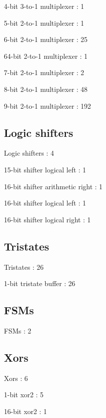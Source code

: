 \documentclass[letterpaper, 11 pt, conference]{article}
\begin{document}
 4-bit 3-to-1 multiplexer                              : 1

 5-bit 2-to-1 multiplexer                              : 1

 6-bit 2-to-1 multiplexer                              : 25

 64-bit 2-to-1 multiplexer                             : 1

 7-bit 2-to-1 multiplexer                              : 2

 8-bit 2-to-1 multiplexer                              : 48

 9-bit 2-to-1 multiplexer                              : 192

\subsection{ Logic shifters}
 Logic shifters                                       : 4

 15-bit shifter logical left                           : 1

 16-bit shifter arithmetic right                       : 1

 16-bit shifter logical left                           : 1

 16-bit shifter logical right                          : 1

\subsection{ Tristates}
Tristates                                            : 26

 1-bit tristate buffer                                 : 26

\subsection{ FSMs}
FSMs                                                 : 2

\subsection{ Xors}
 Xors                                                 : 6

 1-bit xor2                                            : 5

 16-bit xor2                                           : 1
\end{document}
